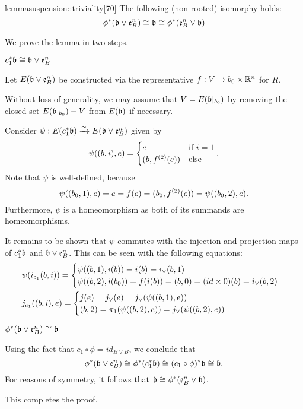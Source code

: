 
\begin{mystatement}{lemma}{suspension::triviality}[70] The following (non-rooted) isomorphy holds: \[ \ind{\phi}(\bb \vee \be{B}) \cong \bb \cong \ind{\phi}(\be{B} \vee \bb) \] \end{mystatement}

\begin{myproof} We prove the lemma in two steps. \begin{steps} \item $\ind{c_1}\bb \cong \bb \vee \be{B}$

Let $E(\bb \vee \be{B})$ be constructed via the representative $f: V \to b_0 \cross \R^n$ for $R$.

Without loss of generality, we may assume that $V = E(\bbb)$ by removing the closed set $E(\bbb) - V$ from $E(\bb)$ if necessary.

Consider $\psi: E(\ind{c_1}\bb) \isomto E(\bb \vee \be{B})$ given by \[ \psi((b, i), e) = \case{e}{(b, \snd{f}(e))}{i = 1}. \] Note that $\psi$ is well-defined, because \[ \psi((b_0, 1), e) = e = f(e) = (b_0, \snd{f}(e)) = \psi((b_0, 2), e). \] Furthermore, $\psi$ is a homeomorphism as both of its summands are homeomorphisms.

It remains to be shown that $\psi$ commutes with the injection and projection maps of $\ind{c_1}\bb$ and $\bb \vee \be{B}$. This can be seen with the following equations: \begin{align} &\psi(i_{c_1}(b, i)) = \casenif{\psi((b, 1), i(b)) = i(b) = i_\vee(b, 1)}{\psi((b, 2), i(b_0)) = f(i(b)) = (b, 0) = (id \cross 0)(b) = i_\vee(b, 2)} \\ &j_{c_1}((b, i), e) = \casenif{j(e) = j_\vee(e) = j_\vee(\psi((b, 1), e))}{(b, 2) = \pi_1(\psi((b, 2), e)) = j_\vee(\psi((b, 2), e))} \end{align}

\item $\ind{\phi}(\bb \vee \be{B}) \cong \bb$

Using the fact that $c_1 \circ \phi = id_{B \vee B}$, we conclude that \[ \ind{\phi}(\bb \vee \be{B}) \cong \ind{\phi}(\ind{c_1}\bb) \cong \ind{(c_1 \circ \phi)}\bb \cong \bb. \] For reasons of symmetry, it follows that $\bb \cong \ind{\phi}(\be{B} \vee \bb)$. \end{steps} This completes the proof. \end{myproof}